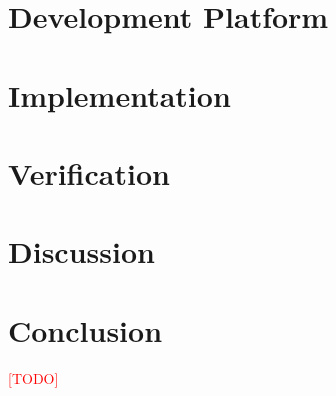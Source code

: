 \documentclass[a4paper]{report}
\newcommand\TODO{\textcolor{red}{[TODO]}}
\begin{document}
\chapter{Development Platform}
    \label{ch:development-platform}
    

\chapter{Implementation}
    \label{ch:implementation}
    

\chapter{Verification}
    \label{ch:verification}
    

\chapter{Discussion}
    \label{ch:discussion}
    

\chapter{Conclusion}
    \label{ch:conclusion}
    \TODO



\end{document}
